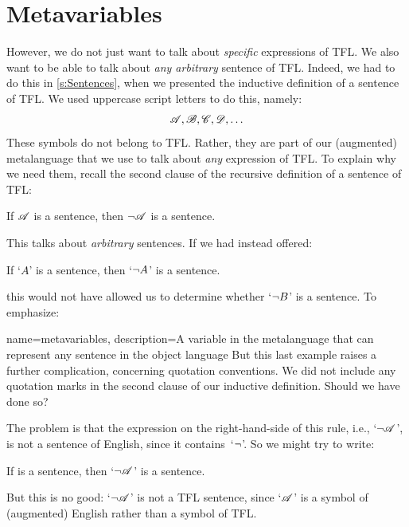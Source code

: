 \section{Metavariables}\label{s:Metavariables}
However, we do not just want to talk about \emph{specific} expressions of TFL. We also want to be able to talk about \emph{any arbitrary} sentence of TFL. Indeed, we had to do this in \cref{s:Sentences}, when we presented the inductive definition of a sentence of TFL. We used uppercase script letters to do this, namely:
	$$\mathscr{A}, \mathscr{B}, \mathscr{C}, \mathscr{D}, \ldots$$
These symbols do not belong to TFL. Rather, they are part of our (augmented) metalanguage that we use to talk about \emph{any} expression of TFL. To explain why we need them, recall the second clause of the recursive definition of a sentence of TFL:
	\begin{compactlist}
		\item[2.] If $\mathscr{A}$ is a sentence, then $\neg \mathscr{A}$ is a sentence.
	\end{compactlist}
This talks about \emph{arbitrary} sentences. If we had instead offered:
	\begin{compactlist}
		\item[2$'$.] If `$A$' is a sentence, then `$\neg A$' is a sentence.
	\end{compactlist}
this would not have allowed us to determine whether `$\neg B$' is a sentence. To emphasize:

{
name=metavariables,
description={A variable in the metalanguage that can represent any sentence in the object language}
}
But this last example raises a further complication, concerning quotation conventions. We did not include any quotation marks in the second clause of our inductive definition. Should we have done so?

The problem is that the expression on the right-hand-side of this rule, i.e., `$\neg\mathscr{A}$', is not a sentence of English, since it contains~`$\neg$'. So we might try to write:
	\begin{numberlist}
		\item[2$''$.] If  is a sentence, then `$\neg \mathscr{A}$' is a sentence.
	\end{numberlist}
But this is no good: `$\neg \mathscr{A}$' is not a TFL sentence, since `$\mathscr{A}$' is a symbol of (augmented) English rather than a symbol of TFL.

